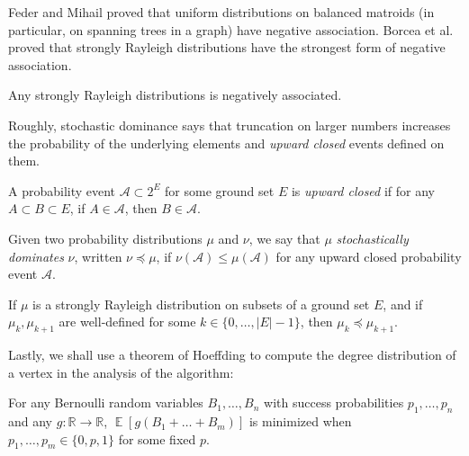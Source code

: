 \documentclass[letterpaper, reqno,12pt]{article}
\newcommand{\RR}{\mathbb{R}}
\newcommand{\EE}{\mathop{{}\mathbb{E}}}
\begin{document}
Feder and Mihail \cite{feder1992balanced} proved that uniform distributions on balanced matroids (in particular, on spanning trees in a graph) have negative association. Borcea et al. \cite{borcea2009negative} proved that strongly Rayleigh distributions have the strongest form of negative association.

\begin{theorem} \label{thm:negative-assoc}
  Any strongly Rayleigh distributions is negatively associated.
\end{theorem}

Roughly, stochastic dominance says that truncation on larger numbers increases the probability of the underlying elements and \emph{upward closed} events defined on them.

\begin{definition}
  A probability event $\mathcal A \subset 2^E$ for some ground set $E$ is \emph{upward closed} if for any $A \subset B \subset E$, if $A \in \mathcal A$, then $B \in \mathcal A$.
\end{definition}

\begin{definition}
  Given two probability distributions $\mu$ and $\nu$, we say that $\mu$ \emph{stochastically dominates} $\nu$, written $\nu \preccurlyeq \mu$, if $\nu(\mathcal A) \leq \mu(\mathcal A)$ for any upward closed probability event $\mathcal A$.
\end{definition}

\begin{theorem} \label{thm:stochastic-dominance}
  If $\mu$ is a strongly Rayleigh distribution on subsets of a ground set $E$, and if $\mu_k, \mu_{k + 1}$ are well-defined for some $k \in \{ 0, \ldots, |E| - 1 \}$, then $\mu_k \preccurlyeq \mu_{k + 1}$.
\end{theorem}

Lastly, we shall use a theorem of Hoeffding \cite{hoeffding1956distribution} to compute the degree distribution of a vertex in the analysis of the algorithm:

\begin{theorem} \label{thm:hoeffding}
  For any Bernoulli random variables $B_1, \ldots, B_n$ with success probabilities $p_1, \ldots, p_n$ and any $g : \RR \to \RR$, $\EE[g(B_1 + \ldots + B_m)]$ is minimized when $p_1, \ldots, p_m \in \{ 0, p, 1 \}$ for some fixed $p$.
\end{theorem}
\end{document}
